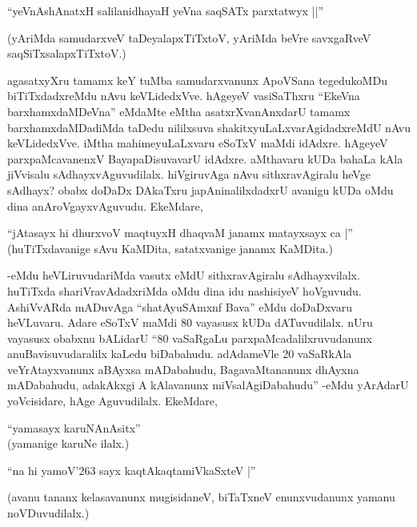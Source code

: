 \begin{shloka}
``yeVnAshAnatxH salilanidhayaH yeVna saqSATx parxtatwyx ||''
\end{shloka}

(yAriMda samudarxveV taDeyalapxTiTxtoV, yAriMda beVre savxgaRveV saqSiTxsalapxTiTxtoV.)

agasatxyXru tamamx keY tuMba samudarxvanunx ApoVSana tegedukoMDu biTiTxdadxreMdu nAvu keVLidedxVve. hAgeyeV vasiSaThxru ``EkeVna barxhamxdaMDeVna'' eMdaMte eMtha asatxrXvanAnxdarU tamamx barxhamxdaMDadiMda taDedu nililxsuva shakitxyuLaLxvarAgidadxreMdU nAvu keVLidedxVve. iMtha mahimeyuLaLxvaru eSoTxV maMdi idAdxre. hAgeyeV parxpaMcavanenxV BayapaDisuvavarU idAdxre. aMthavaru kUDa bahaLa kAla jiVvisalu sAdhayxvAguvudilalx. hiVgiruvAga nAvu sithxravAgiralu heVge sAdhayx? obabx doDaDx DAkaTxru japAninalilxdadxrU avanigu kUDa oMdu dina anAroVgayxvAguvudu. EkeMdare,

\begin{shloka}
``jAtasayx hi dhurxvoV maqtuyxH dhaqvaM janamx matayxsayx ca |''\\
(huTiTxdavanige sAvu KaMDita, satatxvanige janamx KaMDita.)
\end{shloka}

-eMdu heVLiruvudariMda vasutx eMdU sithxravAgiralu sAdhayxvilalx. huTiTxda shariVravAdadxriMda oMdu dina idu nashisiyeV hoVguvudu. AshiVvARda mADuvAga ``shatAyuSAmxnf Bava'' eMdu doDaDxvaru heVLuvaru. Adare eSoTxV maMdi 80 vayasusx kUDa dATuvudilalx. nUru vayasusx obabxnu bALidarU ``80 vaSaRgaLu parxpaMcadalilxruvudanunx anuBavisuvudaralilx kaLedu biDabahudu. adAdameVle 20 vaSaRkAla veYrAtayxvanunx aBAyxsa mADabahudu, BagavaMtananunx dhAyxna mADabahudu, adakAkxgi A kAlavanunx miVsalAgiDabahudu'' -eMdu yArAdarU yoVcisidare, hAge Aguvudilalx. EkeMdare,

\begin{shloka}
``yamasayx karuNAnAsitx''\\
(yamanige karuNe ilalx.)
\end{shloka}

\begin{shloka}
``na hi yamoV\char'263 sayx kaqtAkaqtamiVkaSxteV |''
\end{shloka}

(avanu tananx kelasavanunx mugisidaneV, biTaTxneV enunxvudanunx yamanu noVDuvudilalx.)

